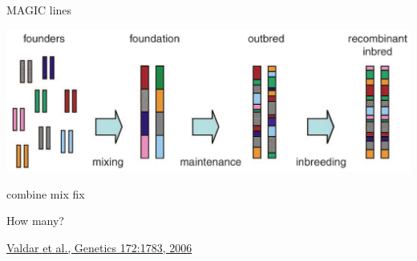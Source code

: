 \documentclass[12pt]{article}
\newcommand{\headsize}{\fontsize{35}{35} \selectfont}
\newcommand{\smallsize}{\fontsize{25}{30} \selectfont}
\newcommand{\smallersize}{\fontsize{20}{25} \selectfont}
\newcommand{\smallestsize}{\fontsize{18}{22} \selectfont}
\begin{document}
\addtocounter{page}{-1}

\headsize \color{myyellow}
\hfill \begin{minipage}{5.75in}
\centering
MAGIC lines
\end{minipage}

\vspace{20mm}

\centerline{\includegraphics[width=10in]{Figs/valdar_genet2006.png}}

\smallsize \color{myyellow}
\hspace*{52mm} combine \hspace*{35mm} mix \hspace*{52mm} fix

\smallersize
\color{mywhite}
\vspace{20pt}

\hspace*{6mm}
\begin{minipage}[t]{45mm}
\vspace*{0mm}
\centering

How many? \\[20pt]

\end{minipage}
\hspace{57mm}
\begin{minipage}[t]{45mm}
\vspace*{0mm}
\centering


\end{minipage}
\hspace{18mm}
\begin{minipage}[t]{45mm}
\vspace*{0mm}
\centering


\end{minipage}


\vfill

\hfill {\smallestsize \color{myblue} \href{http://www.genetics.org/content/172/3/1783.full}{Valdar et al., Genetics 172:1783, 2006}}

\vspace*{5mm}
\end{document}
